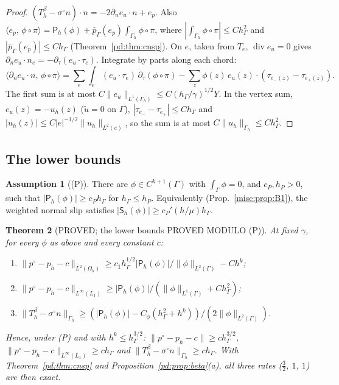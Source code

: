 \documentclass[11pt,reqno]{amsart}
\theoremstyle{plain}
\newtheorem{theorem}{Theorem}[section]
\theoremstyle{definition}
\newtheorem{assumption}[theorem]{Assumption}
\newcommand{\hG}{h_\Gamma}
\newcommand{\Gh}{\Gamma_h}
\newcommand{\Oh}{\Omega_h}
\newcommand{\dn}{\partial_n}
\newcommand{\dt}{\partial_\tau}
\newcommand{\ut}{\tilde u}
\newcommand{\pbG}{\bar p_{\Gamma}}
\newcommand{\ip}[2]{\langle #1,\, #2\rangle}
\newcommand{\norm}[1]{\lVert #1\rVert}
\renewcommand{\div}{\operatorname{div}}
\newcommand{\Lay}{L_1}
\newcommand{\Pm}{\mathsf P_h}     %
\newcommand{\Sm}{\mathsf S_h}     %
\begin{document}
\begin{proof}
$(T^\beta_h-\sigma^\circ n)\cdot n=-2\dn e_u\cdot n+e_p$. Also $\ip{e_p}{\phi\circ\pi}=\Pm(\phi)+\pbG(e_p)\int_{\Gh}\phi\circ\pi$, where $|\int_{\Gh}\phi\circ\pi|\le C\hG^2$ and $|\pbG(e_p)|\le C\hG$ (Theorem~\ref{pd:thm:cnsp}). On $e$, taken from $T_e$, $\div e_u=0$ gives $\dn e_u\cdot n_e=-\dt(e_u\cdot\tau_e)$. Integrate by parts along each chord:
\[
\ip{\dn e_u\cdot n}{\phi\circ\pi}=\sum_e\int_e(e_u\cdot\tau_e)\,\dt(\phi\circ\pi)-\sum_z\phi(z)\,e_u(z)\cdot(\tau_{e_-(z)}-\tau_{e_+(z)}).
\]
The first sum is at most $C\norm{e_u}_{L^1(\Gh)}\le C(\hG/\gamma)^{1/2}Y$. In the vertex sum, $e_u(z)=-u_h(z)$ ($\ut=0$ on $\Gamma$), $|\tau_{e_-}-\tau_{e_+}|\le C\hG$ and $|u_h(z)|\le C|e|^{-1/2}\norm{u_h}_{L^2(e)}$, so the sum is at most $C\norm{u_h}_{\Gh}\le C\hG^2$.
\end{proof}

\subsection{The lower bounds}

\begin{assumption}[(P)]\label{misc:ass:P}
There are $\phi\in C^{k+1}(\Gamma)$ with $\int_\Gamma\phi=0$, and $c_P,h_P>0$, such that $|\Pm(\phi)|\ge c_P\hG$ for $\hG\le h_P$. Equivalently (Prop.~\ref{misc:prop:B1}), the weighted normal slip satisfies $|\Sm(\phi)|\ge c_P'(h/\mu)\hG$.
\end{assumption}

\begin{theorem}[PROVED; the lower bounds PROVED MODULO (P)]\label{misc:thm:P}
At fixed $\gamma$, for every $\phi$ as above and every constant $c$:
\begin{enumerate}[label=(\roman*)]
\item $\norm{p^\circ-p_h-c}_{L^2(\Oh)}\ge c_1\hG^{1/2}|\Pm(\phi)|/\norm\phi_{L^2(\Gamma)}-Ch^k$;
\item $\norm{p^\circ-p_h-c}_{L^\infty(\Lay)}\ge|\Pm(\phi)|/(\norm\phi_{L^1(\Gamma)}+C\hG^2)$;
\item $\norm{T^\beta_h-\sigma^\circ n}_{\Gh}\ge(|\Pm(\phi)|-C_\phi(\hG^2+h^k))/(2\norm\phi_{L^2(\Gamma)})$.
\end{enumerate}
Hence, under (P) and with $h^k\le\hG^{3/2}$: $\norm{p^\circ-p_h-c}\ge c\hG^{3/2}$, $\norm{p^\circ-p_h-c}_{L^\infty(\Lay)}\ge c\hG$ and $\norm{T^\beta_h-\sigma^\circ n}_{\Gh}\ge c\hG$. With Theorem~\ref{pd:thm:cnsp} and Proposition~\ref{pd:prop:beta}(a), all three rates ($\frac32$, $1$, $1$) are then exact.
\end{theorem}
\end{document}
